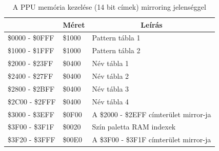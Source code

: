 	\begin{table}[H]
		\footnotesize
		\centering
		\begin{tabular}{|l|l|l|}
			\hline
			\rowcolor[HTML]{C0C0C0} 
			\multicolumn{1}{|c|}{\cellcolor[HTML]{C0C0C0}\textbf{Memórai címek}} & \multicolumn{1}{c|}{\cellcolor[HTML]{C0C0C0}\textbf{Méret}} & \multicolumn{1}{c|}{\cellcolor[HTML]{C0C0C0}\textbf{Leírás}} \\ \hline
			\$0000 - \$0FFF                                                        & \$1000                                                      & Pattern tábla 1                                              \\ \hline
			\$1000 - \$1FFF                                                        & \$1000                                                      & Pattern tábla 2                                              \\ \hline
			\$2000 - \$23FF                                                        & \$0400                                                      & Név tábla 1                                                  \\ \hline
			\$2400 - \$27FF                                                        & \$0400                                                      & Név tábla 2                                                  \\ \hline
			\$2800 - \$2BFF                                                        & \$0400                                                      & Név tábla 3                                                  \\ \hline
			\$2C00 - \$2FFF                                                        & \$0400                                                      & Név tábla 4                                                  \\ \hline
			\$3000 - \$3EFF                                                        & \$0F00                                                      & A \$2000 - \$2EFF címterület mirror-ja                         \\ \hline
			\$3F00 - \$3F1F                                                        & \$0020                                                      & Szín paletta RAM indexek                                     \\ \hline
			\$3F20 - \$3FFF                                                        & \$00E0                                                      & A \$3F00 - \$3F1F címterület mirror-ja                         \\ \hline
		\end{tabular}
		\caption{A PPU memória kezelése (14 bit címek) mirroring jelenséggel}
		\label{tab:PPU-memory}
	\end{table}
	
